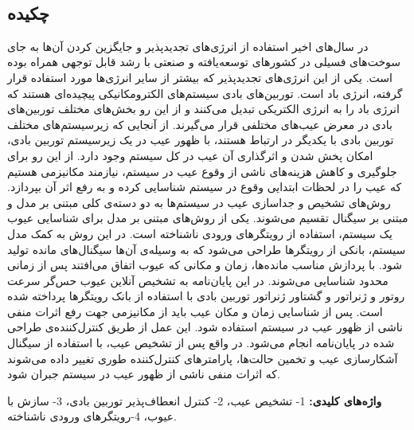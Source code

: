 
\setcounter{page}{1}
\thispagestyle{empty}

~\vfill

\subsection*{چکیده}
\begin{small}
\baselineskip=0.7cm

در سال‌های اخیر استفاده از انرژی‌های تجدید‌پذیر و جایگزین کردن آن‌ها به جای سوخت‌های فسیلی در کشور‌های توسعه‌یافته و صنعتی با رشد قابل توجهی همراه بوده است. یکی از این انرژی‌های تجدید‌پذیر که بیشتر از سایر انرژی‌ها مورد استفاده قرار گرفته، انرژی باد است. توربین‌های بادی سیستم‌های الکترومکانیکی پیچیده‌ای هستند که انرژی باد را به انرژی الکتریکی تبدیل می‌کنند و از این رو بخش‌های مختلف توربین‌های بادی در معرض عیب‌های مختلفی  قرار می‌گیرند. از آنجایی‌ که زیر‌سیستم‌های مختلف توربین بادی با یکدیگر در ارتباط هستند، با ظهور عیب در یک زیر‌سیستم توربین بادی، امکان پخش شدن و اثر‌گذاری آن عیب در کل سیستم وجود دارد. از این رو برای جلوگیری و کاهش هزینه‌های ناشی از وقوع عیب در سیستم، نیازمند مکانیزمی هستیم که عیب را در لحظات ابتدایی وقوع در سیستم شناسایی کرده و به رفع اثر آن بپردازد. روش‌های تشخیص و جداسازی عیب در سیستم‌ها به دو دسته‌ی کلی مبتنی بر مدل و مبتنی بر سیگنال تقسیم می‌شوند. یکی از روش‌های مبتنی بر مدل برای شناسایی عیوب یک سیستم، استفاده از رویتگر‌های ورودی ناشناخته است. در این روش به کمک مدل سیستم، بانکی از رویتگر‌ها طراحی می‌شود که به وسیله‌ی آن‌ها سیگنال‌های مانده تولید شود. با پردازش مناسب مانده‌ها، زمان و مکانی که عیوب اتفاق می‌افتند پس از زمانی محدود شناسایی می‌شوند. در این پایان‌نامه به تشخیص آنلاین عیوب حس‌گر سرعت روتور و ژنراتور و گشتاور ژنراتور توربین بادی با استفاده از بانک رویتگر‌ها پرداخته شده است. پس از شناسایی زمان و مکان عیب باید از مکانیزمی جهت رفع اثرات منفی ناشی از ظهور عیب در سیستم استفاده شود. این عمل از طریق کنترل‌کننده‌ی  طراحی شده در پایان‌نامه انجام می‌شود. در واقع پس از تشخیص عیب، با استفاده از سیگنال آشکارسازی عیب و تخمین حالت‌ها، پارامتر‌های کنترل‌کننده طوری تغییر داده می‌شوند که اثرات منفی ناشی از ظهور عیب در سیستم جبران شود.


\vspace*{0.5 cm}

\noindent\textbf{واژه‌های کلیدی:}
1- تشخیص عیب، 2- کنترل انعطاف‌پذیر توربین بادی، 3- سازش با عیوب، 4-رویتگر‌های ورودی ناشناخته.
\end{small}